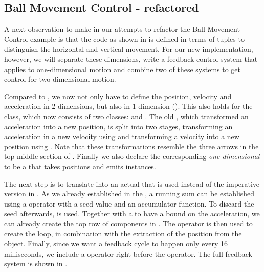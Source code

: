 \subsection{Ball Movement Control - refactored}
A next observation to make in our attempts to refactor the Ball Movement Control example is that the code as shown in  is defined in terms of tuples to distinguish the horizontal and vertical movement. For our new implementation, however, we will separate these dimensions, write a feedback control system that applies to one-dimensional motion and combine two of these systems to get control for two-dimensional motion.

Compared to , we now not only have to define the position, velocity and acceleration in 2 dimensions, but also in 1 dimension (). This also holds for the  class, which now consists of two classes:  and . The old , which transformed an acceleration into a new position, is split into two stages, transforming an acceleration in a new velocity using  and transforming a velocity into a new position using . Note that these transformations resemble the three arrows in the top middle section of . Finally we also declare the corresponding \emph{one-dimensional}  to be a \comp that takes positions and emits  instances.

The next step is to translate  into an actual  that is used instead of the imperative version in . As we already established in the , a running sum can be established using a  operator with a seed value and an accumulator function. To discard the seed afterwards,  is used. Together with a  to have a bound on the acceleration, we can already create the top row of components in . The  operator is then used to create the loop, in combination with the extraction of the position from the  object. Finally, since we want a feedback cycle to happen only every 16 milliseconds, we include a  operator right before the  operator. The full feedback system is shown in .

